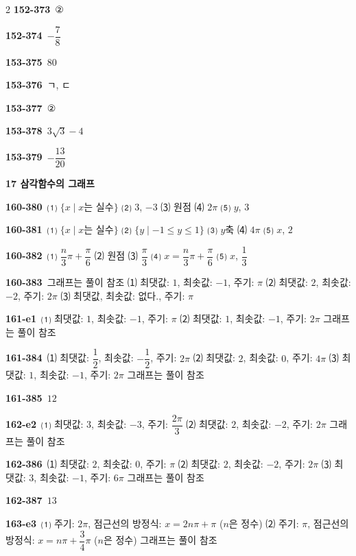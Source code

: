 \documentclass[10pt,a4paper]{article}
\begin{document}
\begin{multicols}{2}
\noindent\textbf{152-373}\ ②\par
\noindent\textbf{152-374}\ $-\dfrac{7}{8}$\par
\noindent\textbf{153-375}\ $80$\par
\noindent\textbf{153-376}\ ㄱ, ㄷ\par
\noindent\textbf{153-377}\ ②\par
\noindent\textbf{153-378}\ $3\sqrt{3}-4$\par
\noindent\textbf{153-379}\ $-\dfrac{13}{20}$\par
\noindent\textbf{17 삼각함수의 그래프}\par\smallskip
\noindent\textbf{160-380}\ ⑴ $\{x \mid x$는 실수$\}$ \quad ⑵ $3$, $-3$ \quad ⑶ 원점 \quad ⑷ $2\pi$ \quad ⑸ $y$, $3$\par
\noindent\textbf{160-381}\ ⑴ $\{x \mid x$는 실수$\}$ \quad ⑵ $\{y \mid -1\le y\le 1\}$ \quad ⑶ $y$축 \quad ⑷ $4\pi$ \quad ⑸ $x$, $2$\par
\noindent\textbf{160-382}\ ⑴ $\dfrac{n}{3}\pi+\dfrac{\pi}{6}$ \quad ⑵ 원점 \quad ⑶ $\dfrac{\pi}{3}$ \quad ⑷ $x=\dfrac{n}{3}\pi+\dfrac{\pi}{6}$ \quad ⑸ $x$, $\dfrac{1}{3}$\par
\noindent\textbf{160-383}\ 그래프는 풀이 참조 \quad ⑴ 최댓값: $1$, 최솟값: $-1$, 주기: $\pi$ \quad ⑵ 최댓값: $2$, 최솟값: $-2$, 주기: $2\pi$ \quad ⑶ 최댓값, 최솟값: 없다., 주기: $\pi$\par
\noindent\textbf{161-e1}\ ⑴ 최댓값: $1$, 최솟값: $-1$, 주기: $\pi$ \quad ⑵ 최댓값: $1$, 최솟값: $-1$, 주기: $2\pi$ \quad 그래프는 풀이 참조\par
\noindent\textbf{161-384}\ ⑴ 최댓값: $\dfrac{1}{2}$, 최솟값: $-\dfrac{1}{2}$, 주기: $2\pi$ \quad ⑵ 최댓값: $2$, 최솟값: $0$, 주기: $4\pi$ \quad ⑶ 최댓값: $1$, 최솟값: $-1$, 주기: $2\pi$ \quad 그래프는 풀이 참조\par
\noindent\textbf{161-385}\ $12$\par
\noindent\textbf{162-e2}\ ⑴ 최댓값: $3$, 최솟값: $-3$, 주기: $\dfrac{2\pi}{3}$ \quad ⑵ 최댓값: $2$, 최솟값: $-2$, 주기: $2\pi$ \quad 그래프는 풀이 참조\par
\noindent\textbf{162-386}\ ⑴ 최댓값: $2$, 최솟값: $0$, 주기: $\pi$ \quad ⑵ 최댓값: $2$, 최솟값: $-2$, 주기: $2\pi$ \quad ⑶ 최댓값: $3$, 최솟값: $-1$, 주기: $6\pi$ \quad 그래프는 풀이 참조\par
\noindent\textbf{162-387}\ $13$\par
\noindent\textbf{163-e3}\ ⑴ 주기: $2\pi$, 점근선의 방정식: $x=2n\pi+\pi$ ($n$은 정수) \quad ⑵ 주기: $\pi$, 점근선의 방정식: $x=n\pi+\dfrac{3}{4}\pi$ ($n$은 정수) \quad 그래프는 풀이 참조\par

\end{multicols}
\end{document}
